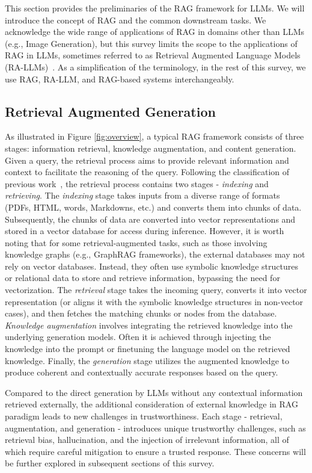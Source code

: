 This section provides the preliminaries of the RAG framework for LLMs. We will introduce the concept of RAG and the common downstream tasks. We acknowledge the wide range of applications of RAG in domains other than LLMs (e.g., Image Generation), but this survey limits the scope to the applications of RAG in LLMs, sometimes referred to as Retrieval Augmented Language Models (RA-LLMs)~\cite{fan2024survey}. As a simplification of the terminology, in the rest of this survey, we use RAG, RA-LLM, and RAG-based systems interchangeably. 

\subsection{Retrieval Augmented Generation}
As illustrated in Figure \ref{fig:overview}, a typical RAG framework consists of three stages: information retrieval, knowledge augmentation, and content generation. Given a query, the retrieval process aims to provide relevant information and context to facilitate the reasoning of the query. Following the classification of previous work~\cite{Gao2023Retrieval}, the retrieval process contains two stages - \textit{indexing} and \textit{retrieving}. The \textit{indexing} stage takes inputs from a diverse range of formats (PDFs, HTML, words, Markdowns, etc.) and converts them into chunks of data. Subsequently, the chunks of data are converted into vector representations and stored in a vector database for access during inference. However, it is worth noting that for some retrieval-augmented tasks, such as those involving knowledge graphs (e.g., GraphRAG frameworks), the external databases may not rely on vector databases. Instead, they often use symbolic knowledge structures or relational data to store and retrieve information, bypassing the need for vectorization. The \textit{retrieval} stage takes the incoming query, converts it into vector representation (or aligns it with the symbolic knowledge structures in non-vector cases), and then fetches the matching chunks or nodes from the database. \textit{Knowledge augmentation} involves integrating the retrieved knowledge into the underlying generation models. Often it is achieved through injecting the knowledge into the prompt or finetuning the language model on the retrieved knowledge. Finally, the \textit{generation} stage utilizes the augmented knowledge to produce coherent and contextually accurate responses based on the query.  

Compared to the direct generation by LLMs without any contextual information retrieved externally, the additional consideration of external knowledge in RAG paradigm leads to new challenges in trustworthiness. Each stage - retrieval, augmentation, and generation - introduces unique trustworthy challenges, such as retrieval bias, hallucination, and the injection of irrelevant information, all of which require careful mitigation to ensure a trusted response. These concerns will be further explored in subsequent sections of this survey.

